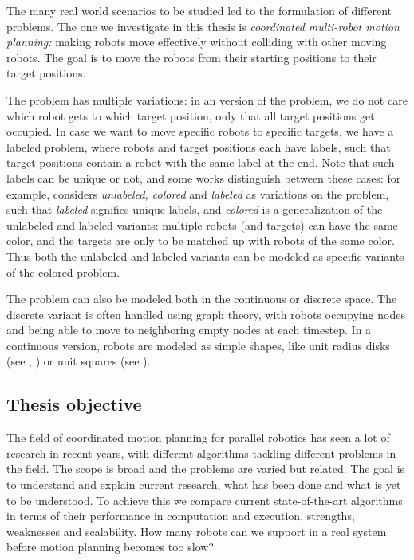 The many real world scenarios to be studied led to the formulation of different problems.
The one we investigate in this thesis is \emph{coordinated multi-robot motion planning:} making robots move effectively without colliding with other moving robots.
The goal is to move the robots from their starting positions to their target positions.

The problem has multiple variations:
in an version of the problem, we do not care which robot gets to which target position, only that all target positions get occupied. 
In case we want to move specific robots to specific targets, we have a labeled problem, where robots and target positions each have labels, such that target positions contain a robot with the same label at the end. 
Note that such labels can be unique or not, and some works distinguish between these cases: for example, \cite{demaineCoordinatedMotionPlanning2019} considers \emph{unlabeled, colored} and \emph{labeled} as variations on the problem, such that \emph{labeled} signifies unique labels, and \emph{colored} is a generalization of the unlabeled and labeled variants: multiple robots (and targets) can have the same color, and the targets are only to be matched up with robots of the same color. 
Thus both the unlabeled and labeled variants can be modeled as specific variants of the colored problem.

The problem can also be modeled both in the continuous or discrete space. 
The discrete variant is often handled using graph theory, with robots occupying nodes and being able to move to neighboring empty nodes at each timestep.
In a continuous version, robots are modeled as simple shapes, like unit radius disks (see \cite{demaineCoordinatedMotionPlanning2019}, \cite{banyassadyUnlabeledMultiRobotMotion2022}) or unit squares (see \cite{yangCoordinatedPathPlanning2022}). 

\subsection{Thesis objective}

The field of coordinated motion planning for parallel robotics has seen a lot of research in recent years, with different algorithms tackling different problems in the field. 
The scope is broad and the problems are varied but related. 
The goal is to understand and explain current research, what has been done and what is yet to be understood. 
To achieve this we compare current state-of-the-art algorithms in terms of their performance in computation and execution, strengths, weaknesses and scalability. How many robots can we support in a real system before motion planning becomes too slow? 

